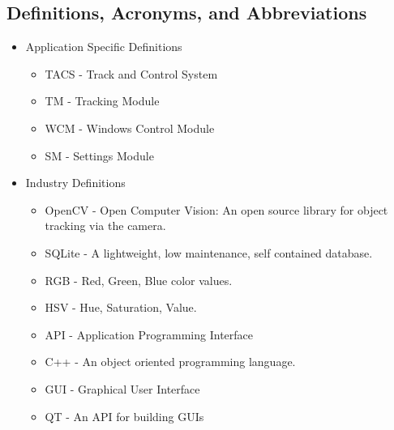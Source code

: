 \documentclass[titlepage]{article}
\begin{document}
\subsection{Definitions, Acronyms, and Abbreviations}
\begin{itemize}
	\item Application Specific Definitions
	\begin{itemize}
		\item TACS - Track and Control System
		\item TM - Tracking Module
		\item WCM - Windows Control Module
		\item SM - Settings Module
	\end{itemize}
	\item Industry Definitions
	\begin{itemize}
		\item OpenCV - Open Computer Vision: An open source library for object tracking via the camera.
		\item SQLite - A lightweight, low maintenance, self contained database.
		\item RGB - Red, Green, Blue color values.
		\item HSV - Hue, Saturation, Value.
		\item API - Application Programming Interface
		\item C++ - An object oriented programming language.
		\item GUI - Graphical User Interface
		\item QT - An API for building GUIs
	\end{itemize}
\end{itemize}
\end{document}

